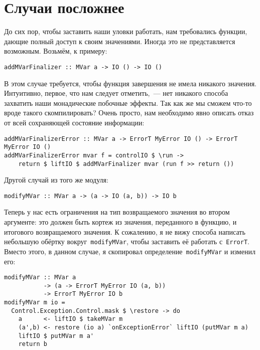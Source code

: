 \section{Случаи посложнее}
До сих пор, чтобы заставить наши уловки работать, нам требовались функции,
дающие полный доступ к своим значениями. Иногда это не представляется возможным.
Возьмём, к примеру:

\begin{lstlisting}
addMVarFinalizer :: MVar a -> IO () -> IO ()
\end{lstlisting}

В этом случае требуется, чтобы функция завершения не имела никакого значения.
Интуитивно, первое, что нам следует отметить,~--- нет
никакого способа захватить наши монадические побочные эффекты. Так как же мы
сможем что-то вроде такого скомпилировать? Очень просто, нам необходимо
явно описать отказ от всей сохраняющей состояние информации:

\begin{lstlisting}
addMVarFinalizerError :: MVar a -> ErrorT MyError IO () -> ErrorT MyError IO ()
addMVarFinalizerError mvar f = controlIO $ \run ->
    return $ liftIO $ addMVarFinalizer mvar (run f >> return ())
\end{lstlisting}

Другой случай из того же модуля:

\begin{lstlisting}
modifyMVar :: MVar a -> (a -> IO (a, b)) -> IO b
\end{lstlisting}

Теперь у нас есть ограничения на тип возвращаемого значения во втором
аргументе: это должен быть кортеж из значения, переданного в функцию, и
итогового возвращаемого значения. К сожалению, я не вижу способа написать
небольшую обёртку вокруг~\lstinline'modifyMVar', чтобы заставить её работать с~\lstinline'ErrorT'.
Вместо этого, в данном случае, я скопировал определение~\lstinline'modifyMVar' и изменил
его:

\begin{lstlisting}
modifyMVar :: MVar a
           -> (a -> ErrorT MyError IO (a, b))
           -> ErrorT MyError IO b
modifyMVar m io =
  Control.Exception.Control.mask $ \restore -> do
    a      <- liftIO $ takeMVar m
    (a',b) <- restore (io a) `onExceptionError` liftIO (putMVar m a)
    liftIO $ putMVar m a'
    return b
\end{lstlisting}
